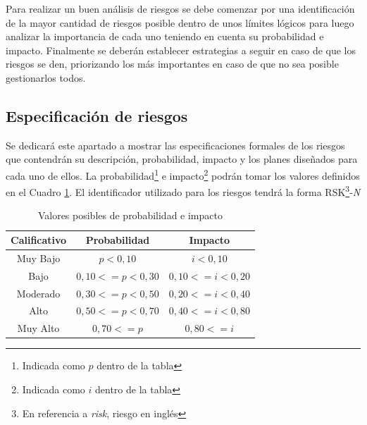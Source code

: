 Para realizar un buen análisis de riesgos se debe comenzar por una identificación de la mayor cantidad de riesgos posible dentro de unos límites lógicos para luego analizar la importancia de cada uno teniendo en cuenta su probabilidad e impacto. Finalmente se deberán establecer estrategias a seguir en caso de que los riesgos se den, priorizando los más importantes en caso de que no sea posible gestionarlos todos.

\subsection{Especificación de riesgos}

Se dedicará este apartado a mostrar las especificaciones formales de los riesgos que contendrán su descripción, probabilidad, impacto y los planes diseñados para cada uno de ellos. La probabilidad\footnote{Indicada como $p$ dentro de la tabla}  e impacto\footnote{Indicada como $i$ dentro de la tabla} podrán tomar los valores definidos en el Cuadro \ref{tab:probabilidad_impacto}. El identificador utilizado para los riesgos tendrá la forma RSK\footnote{En referencia a \textit{risk}, riesgo en inglés}-\textit{N}


\begin{table}
	\begin{center}
		\caption{Valores posibles de probabilidad e impacto}
		\label{tab:probabilidad_impacto}
	\begin{tabular}{ | c | c | c | } 
		\hline
		
		\textbf{Calificativo} &
		\textbf{Probabilidad}&
		\textbf{Impacto}\\
		
		\hline
		Muy Bajo 
		&
		$p<0,10$
		&
		$i<0,10$
		\\ 
		
		\hline
		Bajo 
		&
		$0,10<=p<0,30$
		&
		$0,10<=i<0,20$
		\\ 
		
		\hline
		Moderado 
		&
		$0,30<=p<0,50$
		&
		$0,20<=i<0,40$
		\\ 
		
		\hline
		Alto 
		&
		$0,50<=p<0,70$
		&
		$0,40<=i<0,80$
		\\ 
		
		\hline
		Muy Alto 
		&
		$0,70<=p$
		&
		$0,80<=i$
		\\ 
		
		
		\hline
	\end{tabular}
\end{center}
\end{table}

